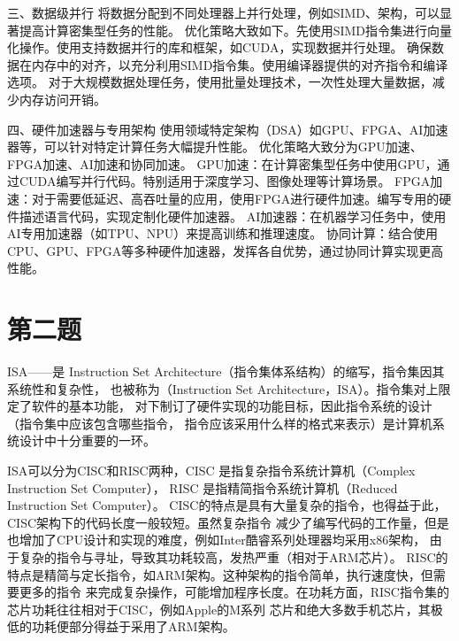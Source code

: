 \documentclass[UTF8]{ctexart}
\begin{document}
三、数据级并行
将数据分配到不同处理器上并行处理，例如SIMD、架构，可以显著提高计算密集型任务的性能。
优化策略大致如下。先使用SIMD指令集进行向量化操作。使用支持数据并行的库和框架，如CUDA，实现数据并行处理。
确保数据在内存中的对齐，以充分利用SIMD指令集。使用编译器提供的对齐指令和编译选项。
对于大规模数据处理任务，使用批量处理技术，一次性处理大量数据，减少内存访问开销。

四、硬件加速器与专用架构
使用领域特定架构（DSA）如GPU、FPGA、AI加速器等，可以针对特定计算任务大幅提升性能。
优化策略大致分为GPU加速、FPGA加速、AI加速和协同加速。
GPU加速：在计算密集型任务中使用GPU，通过CUDA编写并行代码。特别适用于深度学习、图像处理等计算场景。
FPGA加速：对于需要低延迟、高吞吐量的应用，使用FPGA进行硬件加速。编写专用的硬件描述语言代码，实现定制化硬件加速器。
AI加速器：在机器学习任务中，使用AI专用加速器（如TPU、NPU）来提高训练和推理速度。
协同计算：结合使用CPU、GPU、FPGA等多种硬件加速器，发挥各自优势，通过协同计算实现更高性能。

\section{第二题}
ISA——是 Instruction Set Architecture（指令集体系结构）的缩写，指令集因其系统性和复杂性，
也被称为（Instruction Set Architecture，ISA）。指令集对上限定了软件的基本功能，
对下制订了硬件实现的功能目标，因此指令系统的设计（指令集中应该包含哪些指令，
指令应该采用什么样的格式来表示）是计算机系统设计中十分重要的一环。

ISA可以分为CISC和RISC两种，CISC 是指复杂指令系统计算机（Complex Instruction Set Computer），
RISC 是指精简指令系统计算机（Reduced Instruction Set Computer）。
CISC的特点是具有大量复杂的指令，也得益于此，CISC架构下的代码长度一般较短。虽然复杂指令
减少了编写代码的工作量，但是也增加了CPU设计和实现的难度，例如Inter酷睿系列处理器均采用x86架构，
由于复杂的指令与寻址，导致其功耗较高，发热严重（相对于ARM芯片）。
RISC的特点是精简与定长指令，如ARM架构。这种架构的指令简单，执行速度快，但需要更多的指令
来完成复杂操作，可能增加程序长度。在功耗方面，RISC指令集的芯片功耗往往相对于CISC，例如Apple的M系列
芯片和绝大多数手机芯片，其极低的功耗便部分得益于采用了ARM架构。
\end{document}
